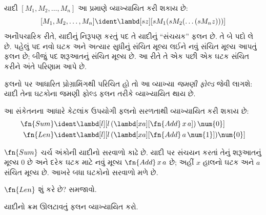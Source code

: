 \documentclass[../../../include/open-logic-section]{subfiles}
\begin{document}

યાદી $[M_1, M_2, \ldots, M_n]$ આ પ્રમાણે
વ્યાખ્યાયિત કરી શકાય છે:
\[
  [M_1, M_2, \ldots, M_n] \ident \lambd[sz][s M_1 (s M_2 (\ldots (s M_n z)))]
\]
અનૌપચારિક રીતે, યાદીનું નિરૂપણ કરતું પદ
તે યાદીનું ``સંચયક'' ફલન છે. તે બે પદો
લે છે. પહેલું પદ નવો ઘટક અને અત્યાર સુધીનું
સંચિત મૂલ્ય લઈને નવું સંચિત મૂલ્ય આપતું
ફલન છે; બીજું પદ શરૂઆતનું સંચિત મૂલ્ય છે.
આ રીતે તે એક પછી એક ઘટક સંચિત કરીને અંતે
પરિણામ આપે છે.


\begin{digress}
  ફલનો પર આધારિત પ્રોગ્રામિંગથી પરિચિત હો
  તો આ વ્યાખ્યા \emph{જમણી ફોલ્ડ} જેવી
  લાગશે: યાદી તેના ઘટકોના જમણી ફોલ્ડ
  ફલન તરીકે વ્યાખ્યાયિત થાય છે.
\end{digress}

આ સંકેતનના આધારે કેટલાંક ઉપયોગી ફલનો
સરળતાથી વ્યાખ્યાયિત કરી શકાય છે:
\begin{align*}
  \fn{Sum} & \ident
  \lambd[l][l \, (\lambd[xa][\fn{Add} \, x \, a])\,  \num{0}]\\
  \fn{Len} & \ident
  \lambd[l][l \, (\lambd[xa][\fn{Add} \, a \, \num{1}]) \num{0}]
\end{align*}

$\fn{Sum}$ ચર્ચ અંકોની યાદીનો સરવાળો
કાઢે છે. યાદી પર સંચયન કરતાં તેનું
શરૂઆતનું મૂલ્ય $\num{0}$ છે અને દરેક
ઘટક માટે નવું મૂલ્ય $\fn{Add} \, x\, a$
છે; અહીં $x$ હાલનો ઘટક અને $a$ સંચિત
મૂલ્ય છે. આખરે બધા ઘટકોનો સરવાળો મળે છે.

\begin{prob}
  $\fn{Len}$ શું કરે છે? સમજાવો.
\end{prob}

\begin{prob}
  યાદીનો ક્રમ ઊલટાવતું ફલન વ્યાખ્યાયિત કરો.
\end{prob}
\end{document}
